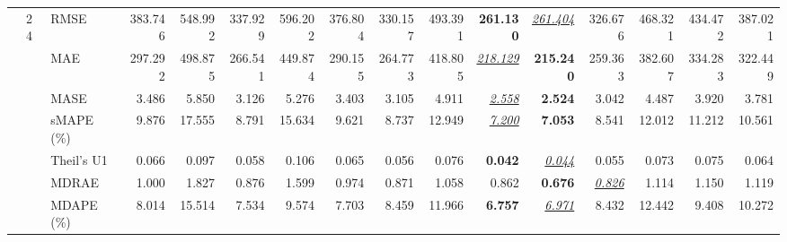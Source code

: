 \begin{table}[!htbp]
{\begin{tabular}{lllrrrrrrrrrrrrr}
 & 24 & RMSE & 383.746 & 548.992 & 337.929 & 596.202 & 376.804 & 330.157 & 493.391 & \textbf{261.130} & \underline{\textit{261.404}} & 326.676 & 468.321 & 434.472 & 387.021 \\
 &  & MAE & 297.292 & 498.875 & 266.541 & 449.874 & 290.155 & 264.773 & 418.805 & \underline{\textit{218.129}} & \textbf{215.240} & 259.363 & 382.607 & 334.283 & 322.449 \\
 &  & MASE & 3.486 & 5.850 & 3.126 & 5.276 & 3.403 & 3.105 & 4.911 & \underline{\textit{2.558}} & \textbf{2.524} & 3.042 & 4.487 & 3.920 & 3.781 \\
 &  & sMAPE (\%) & 9.876 & 17.555 & 8.791 & 15.634 & 9.621 & 8.737 & 12.949 & \underline{\textit{7.200}} & \textbf{7.053} & 8.541 & 12.012 & 11.212 & 10.561 \\
 &  & Theil's U1 & 0.066 & 0.097 & 0.058 & 0.106 & 0.065 & 0.056 & 0.076 & \textbf{0.042} & \underline{\textit{0.044}} & 0.055 & 0.073 & 0.075 & 0.064 \\
 &  & MDRAE & 1.000 & 1.827 & 0.876 & 1.599 & 0.974 & 0.871 & 1.058 & 0.862 & \textbf{0.676} & \underline{\textit{0.826}} & 1.114 & 1.150 & 1.119 \\
 &  & MDAPE (\%) & 8.014 & 15.514 & 7.534 & 9.574 & 7.703 & 8.459 & 11.966 & \textbf{6.757} & \underline{\textit{6.971}} & 8.432 & 12.442 & 9.408 & 10.272 \\
\bottomrule
\end{tabular}}
\end{table}